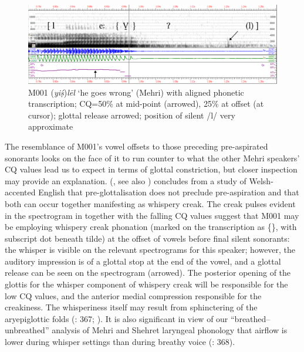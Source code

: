 \documentclass[output=paper]{langscibook}
\begin{document}
\begin{figure}


\includegraphics[width=\textwidth]{figures/a12Watsonetal-img032.pdf}

\caption{M001 (\textit{yiṣ́})\textit{lēl} ‘he goes wrong’ (Mehri) with aligned phonetic transcription; CQ=50\% at mid-point (arrowed), 25\% at offset (at cursor); glottal release arrowed; position of silent \mbox{/l/} very approximate}
\label{fig:watson:29}
\end{figure}

The resemblance of M001’s vowel offsets to those preceding pre-aspirated sonorants looks on the face of it to run counter to what the other Mehri speakers’ CQ values lead us to expect in terms of glottal constriction, but closer inspection may provide an explanation. \citeauthor{Hejná2022} (\citeyear*{Hejná2022}, see also ) concludes from a study of Welsh-accented English that pre-glottalisation does not preclude pre-aspiration and that both can occur together manifesting as whispery creak. The creak pulses evident in the spectrogram in  together with the falling CQ values suggest that M001 may be employing whispery creak phonation (marked on the transcription as \{\Vdottilde{}\}, with subscript dot beneath tilde) at the offset of vowels before final silent sonorants: the whisper is visible on the relevant spectrograms for this speaker; however, the auditory impression is of a glottal stop at the end of the vowel, and a glottal release can be seen on the spectrogram (arrowed). The posterior opening of the glottis for the whisper component of whispery creak \citep[100]{Catford1977} will be responsible for the low CQ values, and the anterior medial compression responsible for the creakiness. The whisperiness itself may result from sphinctering of the aryepiglottic folds (\citealt{EslingHarris2005}: 367; \citealt{MoisikEtAl2019}). It is also significant in view of our ``breathed–unbreathed'' analysis of Mehri and Shehret laryngeal phonology that airflow is lower during whisper settings than during breathy voice (\citealt{EslingHarris2005}: 368).
\end{document}
